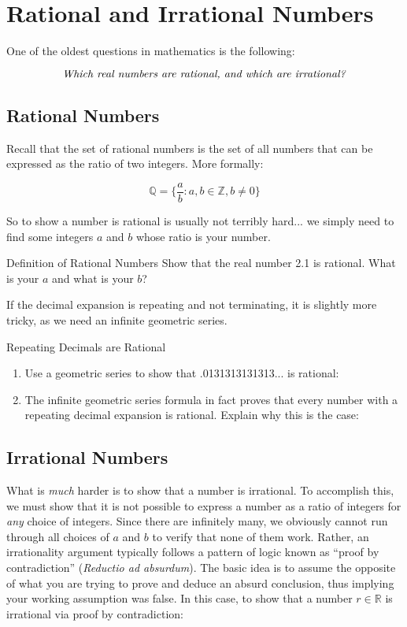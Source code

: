 
\section{Rational and Irrational Numbers}

One of the oldest questions in mathematics is the following:  

$$ \emph{ \text{ Which real numbers are rational, and which are irrational? } }
$$

\subsection{Rational Numbers}

Recall that the set of rational numbers is the set of all numbers that can be expressed as the ratio of two integers.  More formally: 

$$ {\mathbb{Q}}= \Bigg \lbrace \frac{a}{b} : a, b \in { \mathbb{Z} }, b \not = 0 \Bigg \rbrace $$

So to show a number is rational is usually not terribly hard... we simply need to find some integers $a$ and $b$ whose ratio is your number.
\begin{exercise}{Definition of Rational Numbers \Coffeecup}
Show that the real number 2.1 is rational.  What is your $a$ and what is your $b$?
\vspace*{1in}
\end{exercise}

If the decimal expansion is repeating and not terminating, it is slightly more tricky, as we need an infinite geometric series.  
\begin{exercise}{Repeating Decimals are Rational \Coffeecup \Coffeecup}
\begin{enumerate}
\item Use a geometric series to show that .0131313131313... is rational:
\vspace*{2in}
\item The infinite geometric series formula in fact proves that every number with a repeating decimal expansion is rational.  Explain why this is the case:
\vspace*{2in}
\end{enumerate}
\end{exercise}

\subsection{Irrational Numbers}

What is \emph{much} harder is to show that a number is irrational.  To accomplish this, we must show that it is not possible to express a number as a ratio of integers for \emph{any} choice of integers.  Since there are infinitely many, we obviously cannot run through all choices of $a$ and $b$ to verify that none of them work.  Rather,  an irrationality argument typically follows a pattern of logic known as ``proof by contradiction'' (\emph{Reductio ad absurdum}).  The basic idea is to assume the opposite of what you are trying to prove and deduce an absurd conclusion, thus implying your working assumption was false.  In this case, 
to show that a number $r \in \mathbb{R}$ is irrational via proof by contradiction:

